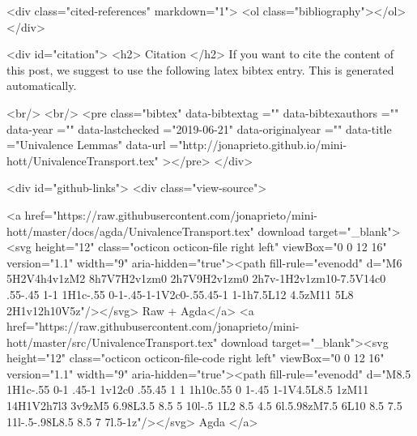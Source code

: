   <div class="cited-references" markdown="1">
  <ol class="bibliography"></ol>
  </div>


  
  <div id="citation">
  <h2> Citation </h2>
  If you want to cite the content of this post,
  we suggest to use the following latex bibtex entry.
  This is generated automatically.

  <br/>
  <br/>
  <pre class="bibtex"
       data-bibtextag =""
       data-bibtexauthors =""
       data-year =""
       data-lastchecked ="2019-06-21"
       data-originalyear =""
       data-title ="Univalence Lemmas"
       data-url ="http://jonaprieto.github.io/mini-hott/UnivalenceTransport.tex"
  ></pre>
  </div>
  

  <div id="github-links">
    <div class="view-source">
      
        <a href="https://raw.githubusercontent.com/jonaprieto/mini-hott/master/docs/agda/UnivalenceTransport.tex" download target="_blank"><svg height="12" class="octicon octicon-file right left" viewBox="0 0 12 16" version="1.1" width="9" aria-hidden="true"><path fill-rule="evenodd" d="M6 5H2V4h4v1zM2 8h7V7H2v1zm0 2h7V9H2v1zm0 2h7v-1H2v1zm10-7.5V14c0 .55-.45 1-1 1H1c-.55 0-1-.45-1-1V2c0-.55.45-1 1-1h7.5L12 4.5zM11 5L8 2H1v12h10V5z"/></svg> Raw + Agda</a>
        <a href="https://raw.githubusercontent.com/jonaprieto/mini-hott/master/src/UnivalenceTransport.tex" download target="_blank"><svg height="12" class="octicon octicon-file-code right left" viewBox="0 0 12 16" version="1.1" width="9" aria-hidden="true"><path fill-rule="evenodd" d="M8.5 1H1c-.55 0-1 .45-1 1v12c0 .55.45 1 1 1h10c.55 0 1-.45 1-1V4.5L8.5 1zM11 14H1V2h7l3 3v9zM5 6.98L3.5 8.5 5 10l-.5 1L2 8.5 4.5 6l.5.98zM7.5 6L10 8.5 7.5 11l-.5-.98L8.5 8.5 7 7l.5-1z"/></svg> Agda </a>
      
